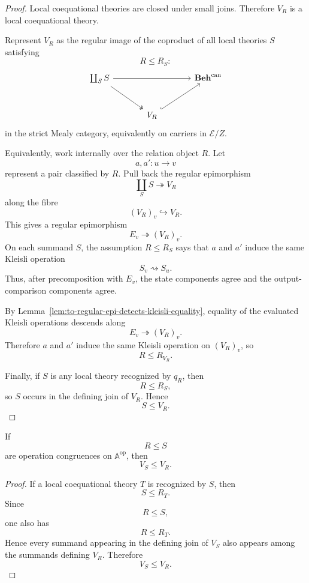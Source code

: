 \begin{proof}
    Local coequational theories are closed under small joins. Therefore
    \(V_R\) is a local coequational theory.

    Represent \(V_R\) as the regular image of the coproduct of all local
    theories \(S\) satisfying
    \[
        R\leq R_S:
    \]
    \[
    \begin{tikzcd}[column sep=large, row sep=large]
        \coprod_S S
            \arrow[rr]
            \arrow[dr, two heads]
        &&
        \mathbf{Beh}^{\mathrm{can}}
        \\
        &
        V_R
            \arrow[ur, hook]
        &
    \end{tikzcd}
    \]
    in the strict Mealy category, equivalently on carriers in \(\mathcal E/Z\).

    Equivalently, work internally over the relation object \(R\). Let
    \[
        a,a':u\to v
    \]
    represent a pair classified by \(R\). Pull back the regular epimorphism
    \[
        \coprod_S S\twoheadrightarrow V_R
    \]
    along the fibre
    \[
        (V_R)_v\hookrightarrow V_R.
    \]
    This gives a regular epimorphism
    \[
        E_v\twoheadrightarrow (V_R)_v.
    \]
    On each summand \(S\), the assumption \(R\leq R_S\) says that \(a\) and
    \(a'\) induce the same Kleisli operation
    \[
        S_v\rightsquigarrow S_u.
    \]
    Thus, after precomposition with \(E_v\), the state components agree and the
    output-comparison components agree.

    By Lemma~\ref{lem:to-regular-epi-detects-kleisli-equality}, equality of
    the evaluated Kleisli operations descends along
    \[
        E_v\twoheadrightarrow (V_R)_v.
    \]
    Therefore \(a\) and \(a'\) induce the same Kleisli operation on
    \((V_R)_v\), so
    \[
        R\leq R_{V_R}.
    \]

    Finally, if \(S\) is any local theory recognized by \(q_R\), then
    \[
        R\leq R_S,
    \]
    so \(S\) occurs in the defining join of \(V_R\). Hence
    \[
        S\leq V_R.
    \]
\end{proof}

\begin{lemma}
\label{lem:to-VR-order-reversing}
    If
    \[
        R\leq S
    \]
    are operation congruences on \(\mathbb A^{\mathrm{op}}\), then
    \[
        V_S\leq V_R.
    \]
\end{lemma}

\begin{proof}
    If a local coequational theory \(T\) is recognized by \(S\), then
    \[
        S\leq R_T.
    \]
    Since
    \[
        R\leq S,
    \]
    one also has
    \[
        R\leq R_T.
    \]
    Hence every summand appearing in the defining join of \(V_S\) also appears
    among the summands defining \(V_R\). Therefore
    \[
        V_S\leq V_R.
    \]
\end{proof}

